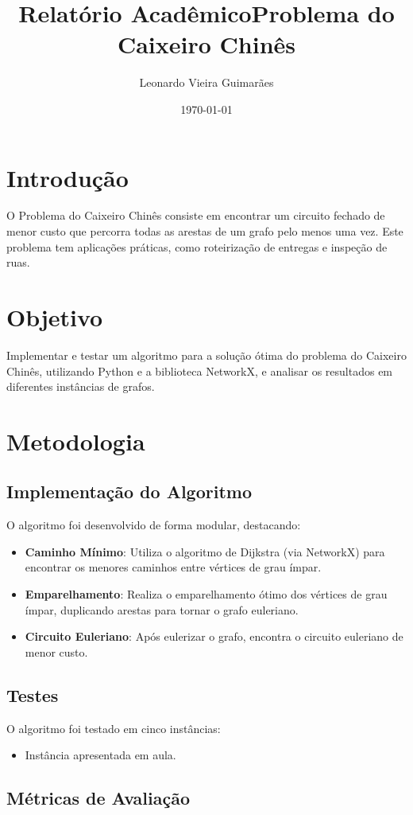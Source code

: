 \documentclass[12pt]{article}
\title{Relatório Acadêmico\newline Problema do Caixeiro Chinês}
\author{Leonardo Vieira Guimarães}
\date{\today}
\begin{document}
\maketitle
\section{Introdução}
O Problema do Caixeiro Chinês consiste em encontrar um circuito fechado de menor custo que percorra todas as arestas de um grafo pelo menos uma vez. Este problema tem aplicações práticas, como roteirização de entregas e inspeção de ruas.

\section{Objetivo}
Implementar e testar um algoritmo para a solução ótima do problema do Caixeiro Chinês, utilizando Python e a biblioteca NetworkX, e analisar os resultados em diferentes instâncias de grafos.

\section{Metodologia}
\subsection{Implementação do Algoritmo}
O algoritmo foi desenvolvido de forma modular, destacando:
\begin{itemize}
    \item \textbf{Caminho Mínimo}: Utiliza o algoritmo de Dijkstra (via NetworkX) para encontrar os menores caminhos entre vértices de grau ímpar.
    \item \textbf{Emparelhamento}: Realiza o emparelhamento ótimo dos vértices de grau ímpar, duplicando arestas para tornar o grafo euleriano.
    \item \textbf{Circuito Euleriano}: Após eulerizar o grafo, encontra o circuito euleriano de menor custo.
\end{itemize}
\subsection{Testes}
O algoritmo foi testado em cinco instâncias:
\begin{itemize}
    \item Instância apresentada em aula.
\end{itemize}

\subsection{Métricas de Avaliação}
\end{document}
